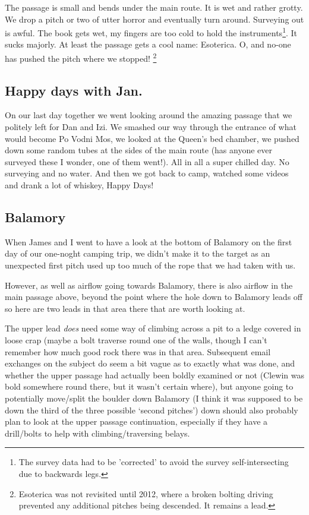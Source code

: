The passage is small and bends under the main route. It is wet and
rather grotty. We drop a pitch or two of utter horror and eventually
turn around. Surveying out is awful. The book gets wet, my fingers are
too cold to hold the
instruments\footnote{The survey data had to be 'corrected' to avoid the survey self-intersecting due to backwards legs.}.
It sucks majorly. At least the passage gets a cool name: Esoterica. O,
and no-one has pushed the pitch where we stopped!
\footnote{Esoterica was not revisited until 2012, where a broken bolting driving prevented any additional pitches being descended. It remains a lead.}


\subsection{Happy days with Jan.}

On our last day together we went looking around the amazing passage that
we politely left for Dan and Izi. We smashed our way through the
entrance of what would become Po Vodni Mos, we looked at the Queen's bed
chamber, we pushed down some random tubes at the sides of the main route
(has anyone ever surveyed these I wonder, one of them went!). All in all
a super chilled day. No surveying and no water. And then we got back to
camp, watched some videos and drank a lot of whiskey, Happy Days!


\subsection{Balamory}

When James and I went to have a look at the bottom of Balamory on the
first day of our one-noght camping trip, we didn't make it to the target
as an unexpected first pitch used up too much of the rope that we had
taken with us.

However, as well as airflow going towards Balamory, there is also
airflow in the main passage above, beyond the point where the hole down
to Balamory leads off so here are two leads in that area there that are
worth looking at.

The upper lead \emph{does} need some way of climbing across a pit to a
ledge covered in loose crap (maybe a bolt traverse round one of the
walls, though I can't remember how much good rock there was in that
area. Subsequent email exchanges on the subject do seem a bit vague as
to exactly what was done, and whether the upper passage had actually
been boldly examined or not (Clewin was bold somewhere round there, but
it wasn't certain where), but anyone going to potentially move/split the
boulder down Balamory (I think it was supposed to be down the third of
the three possible `second pitches') down should also probably plan to
look at the upper passage continuation, especially if they have a
drill/bolts to help with climbing/traversing belays.


